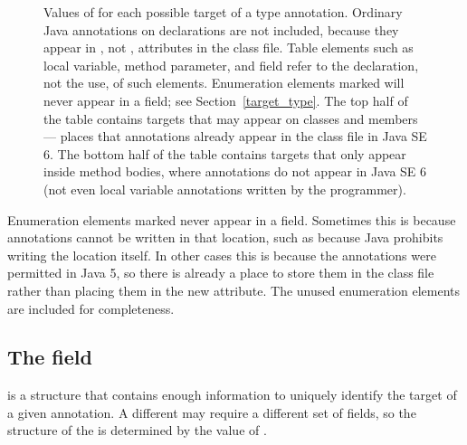 \documentclass[10pt]{article}
\begin{document}
\begin{figure}[thp!]
\begin{center}
\begin{tabular}{|l|c|c|}
\hline
\end{tabular}
\end{center}
\vspace{-10pt}
\caption{\label{tbl:target_types}
  Values of  for each possible target of a type
  annotation.
  Ordinary Java annotations on declarations are not included, because they
  appear in , not \extendedannotation, attributes
  in the class file.
  Table elements such as local variable, method parameter, and field refer
  to the declaration, not the use, of such elements.
\newline
  Enumeration elements marked \unused{} will never appear in a
   field; see Section~\ref{target_type}.
\newline
  The top half of the table contains targets that may appear on classes and
  members --- places that annotations already appear in the class file in
  Java SE 6.
  The bottom half of the table contains targets that only appear inside
  method bodies, where annotations do not appear in Java SE 6 (not even
  local variable annotations written by the programmer).
}
\end{figure}


Enumeration elements marked \unused{} never appear in a 
field.  Sometimes this is because annotations cannot be written in that
location, such as because Java prohibits writing the location itself.  In
other cases this is because the annotations were permitted in Java 5, so
there is already a place to store them in the class file
rather than placing them in the new \RuntimeInOrVisibleTypeAnnotations
attribute.  The unused enumeration elements are included for completeness.


\subsection{The  field\label{class-file:ext:target_info}}

 is a structure that contains enough information to
uniquely identify the target of a given annotation.  A different
 may require a different set of fields, so the structure
of the  is determined by the value of
.
\end{document}
